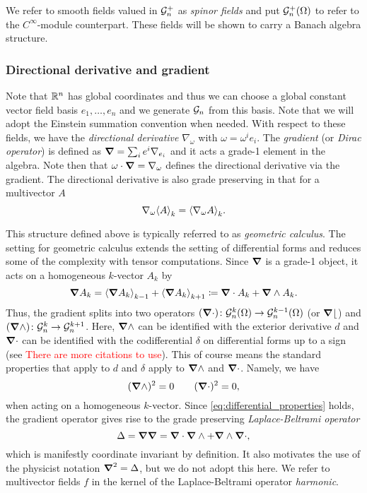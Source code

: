 We refer to smooth fields valued in $\G_n^+$ as \emph{spinor fields} and put $\G_n^+(\Omega)$ to refer to the $C^\infty$-module counterpart. These fields will be shown to carry a Banach algebra structure. 


\subsubsection{Directional derivative and gradient}

Note that $\R^n$ has global coordinates and thus we can choose a global constant vector field basis $e_1,\dots,e_n$ and we generate $\G_n$ from this basis. Note that we will adopt the Einstein summation convention when needed. With respect to these fields, we have the \emph{directional derivative} $\nabla_\omega$ with $\omega = \omega^i e_i$. The \emph{gradient} (or \emph{Dirac operator}) is defined as $\grad = \sum_{i} e^i \nabla_{e_i}$ and it acts a grade-1 element in the algebra.   Note then that $\omega \cdot \grad = \nabla_\omega$ defines the directional derivative via the gradient. The directional derivative is also grade preserving in that for a multivector $A$
\[
\nabla_\omega \proj{k}{A} = \proj{k}{\nabla_\omega A}.
\]  

This structure defined above is typically referred to as \emph{geometric calculus}.  The setting for geometric calculus extends the setting of differential forms and reduces some of the complexity with tensor computations.  Since $\grad$ is a grade-1 object, it acts on a homogeneous $k$-vector $A_k$ by
\[
\grad A_k = \proj{k-1}{\grad A_k} + \proj{k+1}{\grad A_k} \coloneqq \grad \cdot A_k + \grad \wedge A_k.
\]
Thus, the gradient splits into two operators $(\grad \cdot) \colon \G_n^k(\Omega) \to \G_n^{k-1}(\Omega)$ (or $\grad \lfloor$) and $(\grad \wedge) \colon \G_n^k \to \G_n^{k+1}$.  Here, $\grad \wedge$ can be identified with the exterior derivative $d$ and $\grad \cdot$ can be identified with the codifferential $\delta$ on differential forms up to a sign (see \cite{schindler_geometric_2020} \textcolor{red}{There are more citations to use}). This of course means the standard properties that apply to $d$ and $\delta$ apply to $\grad \wedge$ and $\grad \cdot$. Namely, we have
\begin{equation}
\label{eq:differential_properties}
(\grad \wedge)^2=0 \qquad (\grad \cdot)^2 = 0,
\end{equation}
when acting on a homogeneous $k$-vector. Since \ref{eq:differential_properties} holds, the gradient operator gives rise to the grade preserving \emph{Laplace-Beltrami operator}
\[
\Delta = \grad \grad = \grad \cdot \grad \wedge + \grad \wedge \grad \cdot,
\]
which is manifestly coordinate invariant by definition.  It also motivates the use of the physicist notation $\grad^2=\Delta$, but we do not adopt this here.  We refer to multivector fields $f$ in the kernel of the Laplace-Beltrami operator \emph{harmonic}.

